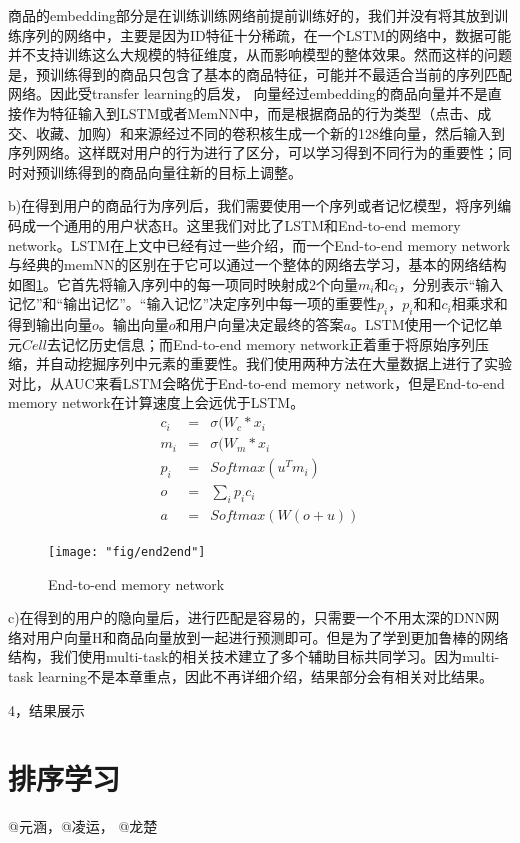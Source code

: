 商品的embedding部分是在训练训练网络前提前训练好的，我们并没有将其放到训练序列的网络中，主要是因为ID特征十分稀疏，在一个LSTM的网络中，数据可能并不支持训练这么大规模的特征维度，从而影响模型的整体效果。然而这样的问题是，预训练得到的商品只包含了基本的商品特征，可能并不最适合当前的序列匹配网络。因此受transfer learning的启发，
向量经过embedding的商品向量并不是直接作为特征输入到LSTM或者MemNN中，而是根据商品的行为类型（点击、成交、收藏、加购）和来源经过不同的卷积核生成一个新的128维向量，然后输入到序列网络。这样既对用户的行为进行了区分，可以学习得到不同行为的重要性；同时对预训练得到的商品向量往新的目标上调整。

b)在得到用户的商品行为序列后，我们需要使用一个序列或者记忆模型，将序列编码成一个通用的用户状态H。这里我们对比了LSTM和End-to-end memory network\cite{9}。LSTM在上文中已经有过一些介绍，而一个End-to-end memory network与经典的memNN的区别在于它可以通过一个整体的网络去学习，基本的网络结构如图\ref{fig:end2end}。它首先将输入序列中的每一项同时映射成2个向量$m_i$和$c_i$，分别表示“输入记忆”和“输出记忆”。“输入记忆”决定序列中每一项的重要性$p_i$，$p_i$和和$c_i$相乘求和得到输出向量$o$。输出向量$o$和用户向量决定最终的答案$a$。LSTM使用一个记忆单元$Cell$去记忆历史信息；而End-to-end memory network正着重于将原始序列压缩，并自动挖掘序列中元素的重要性。我们使用两种方法在大量数据上进行了实验对比，从AUC来看LSTM会略优于End-to-end memory network，但是End-to-end memory network在计算速度上会远优于LSTM。
\begin{eqnarray}
c_i &=& \sigma(W_{c} * x_{i}
\\
m_i &=& \sigma(W_{m} * x_{i}
\\
p_i &=& Softmax(u^T m_i)
\\
o &=& \sum_{i}p_i c_i
\\
a &=& Softmax(W(o+u))
\end{eqnarray}

\begin{figure}[h]
	\centering
	\texttt{[image: "fig/end2end"]}
	\caption{End-to-end memory network}
	\label{fig:end2end}
\end{figure}

c)在得到的用户的隐向量后，进行匹配是容易的，只需要一个不用太深的DNN网络对用户向量H和商品向量放到一起进行预测即可。但是为了学到更加鲁棒的网络结构，我们使用multi-task的相关技术\cite{16}建立了多个辅助目标共同学习。因为multi-task learning不是本章重点，因此不再详细介绍，结果部分会有相关对比结果。

4，结果展示

\section{排序学习}
	@元涵，@凌运， @龙楚
